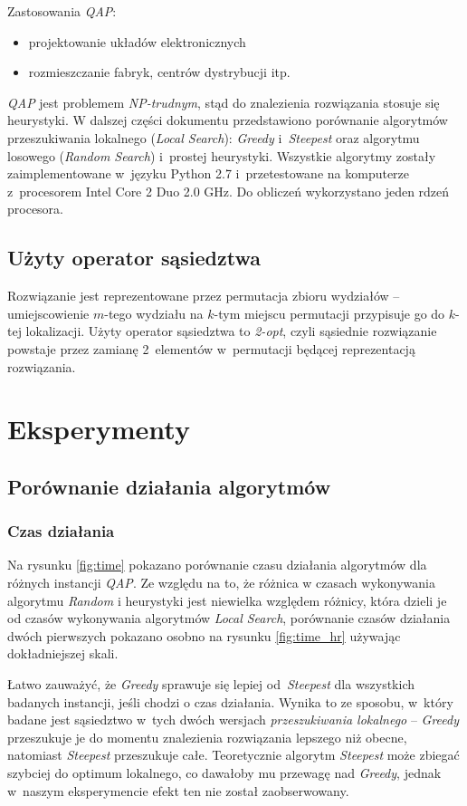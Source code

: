 \documentclass{article}
\begin{document}
	Zastosowania \emph{QAP}:
	\begin{itemize}
		\item{projektowanie układów elektronicznych}
		\item{rozmieszczanie fabryk, centrów dystrybucji itp.}
	\end{itemize}
	
	\emph{QAP} jest problemem \emph{NP-trudnym}, stąd do znalezienia rozwiązania stosuje się heurystyki. W dalszej części dokumentu przedstawiono porównanie algorytmów przeszukiwania lokalnego (\emph{Local Search}): \emph{Greedy} i~\emph{Steepest} oraz algorytmu losowego (\emph{Random Search}) i~prostej heurystyki. Wszystkie algorytmy zostały zaimplementowane w~języku Python 2.7 i~przetestowane na komputerze z~procesorem Intel Core 2 Duo 2.0 GHz. Do obliczeń wykorzystano jeden rdzeń procesora.

	\subsection{Użyty operator sąsiedztwa\label{ss:operator}}
	Rozwiązanie jest reprezentowane przez permutacja zbioru wydziałów -- umiejscowienie $m$-tego wydziału na $k$-tym miejscu permutacji przypisuje go do $k$-tej lokalizacji.
	Użyty operator sąsiedztwa to \emph{2-opt}, czyli sąsiednie rozwiązanie powstaje przez zamianę 2~elementów w~permutacji będącej reprezentacją rozwiązania.

\section{Eksperymenty}
	\subsection{Porównanie działania algorytmów}
		\subsubsection{Czas działania}


			Na rysunku \ref{fig:time} pokazano porównanie czasu działania algorytmów dla różnych instancji \emph{QAP}. Ze względu na to, że różnica w czasach wykonywania algorytmu \emph{Random} i heurystyki jest niewielka względem różnicy, która dzieli je od czasów wykonywania algorytmów \emph{Local Search}, porównanie czasów działania dwóch pierwszych pokazano osobno na rysunku \ref{fig:time_hr} używając dokładniejszej skali.


			Łatwo zauważyć, że \emph{Greedy} sprawuje się lepiej od~\emph{Steepest} dla wszystkich badanych instancji, jeśli chodzi o czas działania. Wynika to ze sposobu, w~który badane jest sąsiedztwo w~tych dwóch wersjach \emph{przeszukiwania lokalnego} -- \emph{Greedy} przeszukuje je do momentu znalezienia rozwiązania lepszego niż obecne, natomiast \emph{Steepest} przeszukuje całe. Teoretycznie algorytm \emph{Steepest} może zbiegać szybciej do optimum lokalnego, co dawałoby mu przewagę nad \emph{Greedy}, jednak w~naszym eksperymencie efekt ten nie został zaobserwowany.
\end{document}
